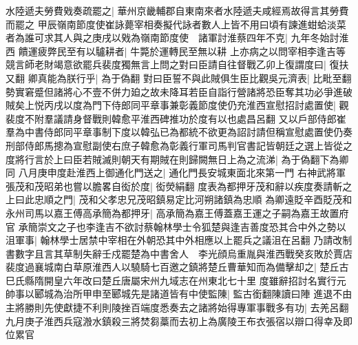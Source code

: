 水陸遞夫勞費戣奏疏罷之|{
	華州京畿輔郡自東南來者水陸遞夫咸經焉故得言其勞費而罷之}
甲辰嶺南節度使崔詠薨宰相奏擬代詠者數人上皆不用曰頃有諫進蚶蛤淡菜者為誰可求其人與之庚戌以戣為嶺南節度使　諸軍討淮蔡四年不克|{
	九年冬始討淮西}
饋運疲弊民至有以驢耕者|{
	牛斃於運轉民至無以耕}
上亦病之以問宰相李逢吉等競言師老財竭意欲罷兵裴度獨無言上問之對曰臣請自往督戰乙卯上復謂度曰|{
	復扶又翻}
卿真能為朕行乎|{
	為于偽翻}
對曰臣誓不與此賊俱生臣比觀吳元濟表|{
	比毗至翻}
勢實窘蹙但諸將心不壹不併力廹之故未降耳若臣自詣行營諸將恐臣奪其功必爭進破賊矣上悦丙戌以度為門下侍郎同平章事兼彰義節度使仍充淮西宣慰招討處置使|{
	觀裴度不附羣議請身督戰則韓愈平淮西碑推功於度有以也處昌呂翻}
又以戶部侍郎崔羣為中書侍郎同平章事制下度以韓弘已為都統不欲更為詔討請但稱宣慰處置使仍奏刑部侍郎馬摠為宣慰副使右庶子韓愈為彰義行軍司馬判官書記皆朝廷之選上皆從之度將行言於上曰臣若賊滅則朝天有期賊在則歸闕無日上為之流涕|{
	為于偽翻下為卿同}
八月庚申度赴淮西上御通化門送之|{
	通化門長安城東面北來第一門}
右神武將軍張茂和茂昭弟也嘗以膽畧自衒於度|{
	衒熒絹翻}
度表為都押牙茂和辭以疾度奏請斬之上曰此忠順之門|{
	茂和父孝忠兄茂昭鎮易定比河朔諸鎮為忠順}
為卿遠貶辛酉貶茂和永州司馬以嘉王傅高承簡為都押牙|{
	高承簡為嘉王傅蓋嘉王運之子嗣為嘉王故置府官}
承簡崇文之子也李逢吉不欲討蔡翰林學士令狐楚與逢吉善度恐其合中外之勢以沮軍事|{
	翰林學士居禁中宰相在外朝恐其中外相應以上罷兵之議沮在呂翻}
乃請改制書數字且言其草制失辭壬戍罷楚為中書舍人　李光顔烏重胤與淮西戰癸亥敗於賈店　裴度過襄城南白草原淮西人以驍騎七百邀之鎮將楚丘曹華知而為備擊却之|{
	楚丘古巳氏縣隋開皇六年改曰楚丘唐屬宋州九域志在州東北七十里}
度雖辭招討名實行元帥事以郾城為治所甲申至郾城先是諸道皆有中使監陳|{
	監古銜翻陳讀曰陣}
進退不由主將勝則先使獻捷不利則陵挫百端度悉奏去之諸將始得專軍事戰多有功|{
	去羌呂翻}
九月庚子淮西兵寇溵水鎮殺三將焚芻藁而去初上為廣陵王布衣張宿以辯口得幸及即位累官

